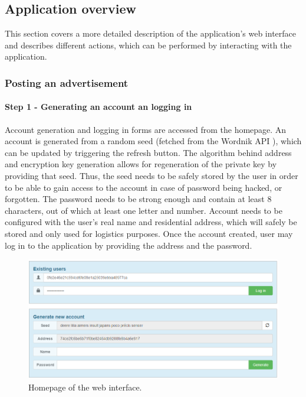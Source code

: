 \subsection{Application overview}

This section covers a more detailed description of the application's web interface and describes different actions, which can be performed by interacting with the application.

\subsubsection{Posting an advertisement}

\paragraph{Step 1 - Generating an account an logging in}

Account generation and logging in forms are accessed from the homepage. An account is generated from a random seed (fetched from the Wordnik API \citep{wordnik}), which can be updated by triggering the refresh button. The algorithm behind address and encryption key generation allows for regeneration of the private key by providing that seed. Thus, the seed needs to be safely stored by the user in order to be able to gain access to the account in case of password being hacked, or forgotten. The password needs to be strong enough and contain at least 8 characters, out of which at least one letter and number. Account needs to be configured with the user's real name and residential address, which will safely be stored and only used for logistics purposes. Once the account created, user may log in to the application by providing the address and the password.

\begin{figure}[H]
\centering
\includegraphics[scale=0.56]{app_screens/login.png}
\caption{Homepage of the web interface.}
\label{fig:applogin}
\end{figure}

